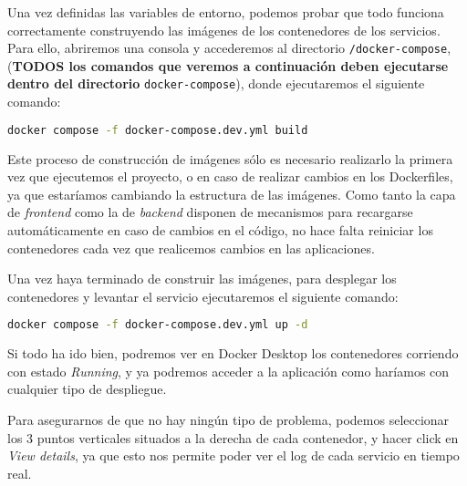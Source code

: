 Una vez definidas las variables de entorno, podemos probar que todo funciona correctamente construyendo las imágenes de los contenedores de los servicios. Para ello, abriremos una consola y accederemos al directorio \verb,/docker-compose,, (\textbf{TODOS los comandos que veremos a continuación deben ejecutarse dentro del directorio} \verb,docker-compose,), donde ejecutaremos el siguiente comando:

\begin{lstlisting}[language=Bash]
docker compose -f docker-compose.dev.yml build
\end{lstlisting}


Este proceso de construcción de imágenes sólo es necesario realizarlo la primera vez que ejecutemos el proyecto, o en caso de realizar cambios en los Dockerfiles, ya que estaríamos cambiando la estructura de las imágenes. Como tanto la capa de \textit{frontend} como la de \textit{backend} disponen de mecanismos para recargarse automáticamente en caso de cambios en el código, no hace falta reiniciar los contenedores cada vez que realicemos cambios en las aplicaciones.

Una vez haya terminado de construir las imágenes, para desplegar los contenedores y levantar el servicio ejecutaremos el siguiente comando:

\begin{lstlisting}[language=Bash]
docker compose -f docker-compose.dev.yml up -d
\end{lstlisting}


Si todo ha ido bien, podremos ver en Docker Desktop los contenedores corriendo con estado \textit{Running}, y ya podremos acceder a la aplicación como haríamos con cualquier tipo de despliegue. 


Para asegurarnos de que no hay ningún tipo de problema, podemos seleccionar los 3 puntos verticales situados a la derecha de cada contenedor, y hacer click en \textit{View details}, ya que esto nos permite poder ver el log de cada servicio en tiempo real. 



